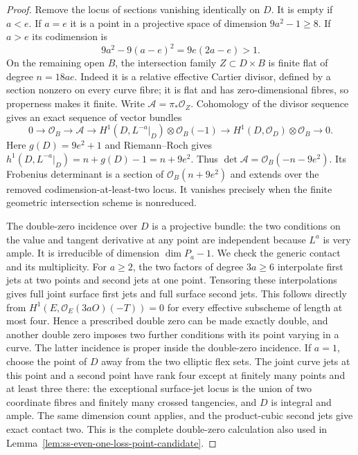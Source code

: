 \begin{proof}
Remove the locus of sections vanishing identically on $D$.
It is empty if $a<e$. If $a=e$ it is a point in a projective
space of dimension $9a^2-1\ge8$. If $a>e$ its codimension is
\[
                  9a^2-9(a-e)^2=9e(2a-e)>1.
\]
On the remaining open $B$, the intersection family
$Z\subset D\times B$ is finite flat of degree $n=18ae$.
Indeed it is a relative effective Cartier divisor, defined by a
section nonzero on every curve fibre; it is flat and has
zero-dimensional fibres, so properness makes it finite.
Write $\mathcal A=\pi_*\mathcal O_Z$. Cohomology of the divisor
sequence gives an exact sequence of vector bundles
\[
 0\to\mathcal O_B\to\mathcal A\to
 H^1(D,L^{-a}|_D)\otimes\mathcal O_B(-1)
       \to H^1(D,\mathcal O_D)\otimes\mathcal O_B\to0.
\]
Here $g(D)=9e^2+1$ and Riemann--Roch gives
$h^1(D,L^{-a}|_D)=n+g(D)-1=n+9e^2$.
Thus $\det\mathcal A=\mathcal O_B(-n-9e^2)$.
Its Frobenius determinant is a section of
$\mathcal O_B(n+9e^2)$ and extends over the removed
codimension-at-least-two locus. It vanishes precisely when the
finite geometric intersection scheme is nonreduced.

The double-zero incidence over $D$ is a projective bundle:
the two conditions on the value and tangent derivative at any
point are independent because $L^a$ is very ample.
It is irreducible of dimension $\dim P_a-1$.
We check the generic contact and its multiplicity.
For $a\ge2$, the two factors of degree $3a\ge6$ interpolate
first jets at two points and second jets at one point. Tensoring
these interpolations gives full joint surface first jets and
full surface second jets. This follows directly from
$H^1(E,\mathcal O_E(3aO)(-T))=0$ for every effective
subscheme of length at most four. Hence a prescribed double
zero can be made exactly double, and another double zero
imposes two further conditions with its point varying in a
curve. The latter incidence is proper inside the double-zero
incidence. If $a=1$, choose the point of $D$ away from the two
elliptic flex sets. The joint curve jets at this point and a
second point have rank four except at finitely many points and
at least three there: the exceptional surface-jet locus is the
union of two coordinate fibres and finitely many crossed
tangencies, and $D$ is integral and ample. The same dimension
count applies, and the product-cubic second jets give exact
contact two. This is the complete double-zero calculation also
used in Lemma~\ref{lem:ss-even-one-loss-point-candidate}.


\end{proof}
